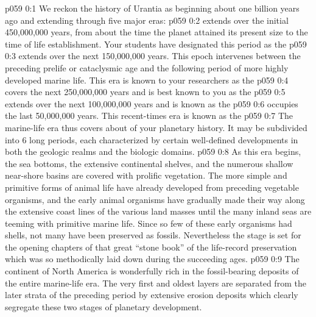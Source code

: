 \author{Life Carrier}
\vs p059 0:1 We reckon the history of Urantia as beginning about one billion years ago and extending through five major eras:
\vs p059 0:2 \bibnobreakspace {} extends over the initial 450,000,000 years, from about the time the planet attained its present size to the time of life establishment. Your students have designated this period as the 
\vs p059 0:3 \bibnobreakspace {} extends over the next 150,000,000 years. This epoch intervenes between the preceding prelife or cataclysmic age and the following period of more highly developed marine life. This era is known to your researchers as the 
\vs p059 0:4 \bibnobreakspace {} covers the next 250,000,000 years and is best known to you as the 
\vs p059 0:5 \bibnobreakspace {} extends over the next 100,000,000 years and is known as the 
\vs p059 0:6 \bibnobreakspace {} occupies the last 50,000,000 years. This recent\hyp{}times era is known as the 
\vs p059 0:7 \pc The marine\hyp{}life era thus covers about  of your planetary history. It may be subdivided into 6 long periods, each characterized by certain well\hyp{}defined developments in both the geologic realms and the biologic domains.
\vs p059 0:8 As this era begins, the sea bottoms, the extensive continental shelves, and the numerous shallow near\hyp{}shore basins are covered with prolific vegetation. The more simple and primitive forms of animal life have already developed from preceding vegetable organisms, and the early animal organisms have gradually made their way along the extensive coast lines of the various land masses until the many inland seas are teeming with primitive marine life. Since so few of these early organisms had shells, not many have been preserved as fossils. Nevertheless the stage is set for the opening chapters of that great “stone book” of the life\hyp{}record preservation which was so methodically laid down during the succeeding ages.
\vs p059 0:9 The continent of North America is wonderfully rich in the fossil\hyp{}bearing deposits of the entire marine\hyp{}life era. The very first and oldest layers are separated from the later strata of the preceding period by extensive erosion deposits which clearly segregate these two stages of planetary development.
